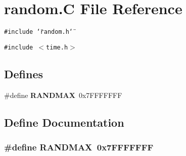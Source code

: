 \section{random.C File Reference}
\label{random_8C}
{\tt \#include \char`\"{}random.h\char`\"{}}\par
{\tt \#include $<$time.h$>$}\par
\subsection*{Defines}
\begin{CompactItemize}
\item 
\#define {\bf RANDMAX}\ 0x7FFFFFFF
\end{CompactItemize}


\subsection{Define Documentation}
\subsubsection{\setlength{\rightskip}{0pt plus 5cm}\#define RANDMAX\ 0x7FFFFFFF}\label{random_8C_a0}


